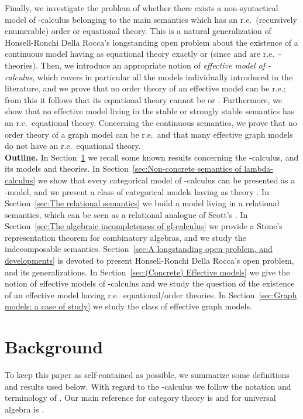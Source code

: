 \documentclass[english]{llncs}
\begin{document}
Finally, we investigate the problem of whether there exists a non-syntactical model of -calculus belonging to the main semantics which has an r.e.\ 
(recursively enumerable) order or equational theory. 
This is a natural generalization of Honsell-Ronchi Della Rocca's longstanding open problem about the existence of a continuous model having as equational theory exactly  or 
 (since  and  are r.e.\ -theories). 
Then, we introduce an appropriate notion of {\em effective model of -calculus}, which covers in particular all the models individually introduced in the literature,
and we prove that no order theory of an effective model can be r.e.; from this it follows that its equational theory cannot be  or .
Furthermore, we show that no effective model living in the stable or strongly stable semantics has an r.e.\ equational theory.
Concerning the continuous semantics, we prove that no order theory of a graph model can be r.e.\ and that many effective graph models do not have an r.e.\ equational theory.\\

{\bf Outline.} In Section~\ref{sec:Preliminaries} we recall some known results concerning the -calculus, and its models and theories.
In Section~\ref{sec:Non-concrete semantics of lambda-calculus} we show that every categorical model of -calculus can be presented as a -model,
and we present a class of categorical models having as theory .
In Section~\ref{sec:The relational semantics} we build a model  living in a relational semantics,
which can be seen as a relational analogue of Scott's .
In Section~\ref{sec:The algebraic incompleteness of gl-calculus} we provide a Stone's representation theorem for combinatory algebras, 
and we study the indecomposable semantics.
Section~\ref{sec:A longstanding open problem, and developments} is devoted to present Honsell-Ronchi Della Rocca's open problem,
and its generalizations.
In Section~\ref{sec:(Concrete) Effective models} we give the notion of effective models of -calculus and 
we study the question of the existence of an effective model having r.e.\ equational/order theories.
In Section~\ref{sec:Graph models: a case of study} we study the class of effective graph models.


\section{Background}\label{sec:Preliminaries}

To keep this paper as self-contained as possible, we summarize some definitions and results used below. 
With regard to the -calculus we follow the notation and terminology of \cite{Bare}. 
Our main reference for category theory is \cite{MacLaneS71} and for universal algebra is \cite{BurrisS81}.
\end{document}
